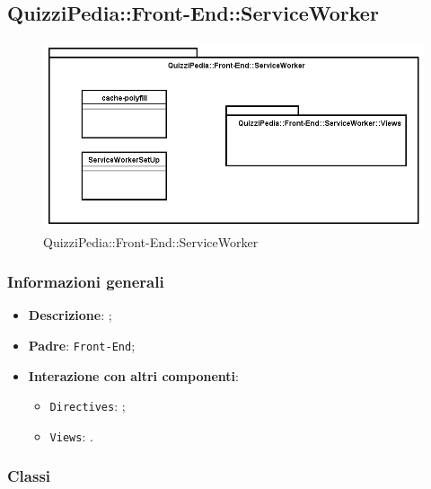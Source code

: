 \newpage
\subsection{QuizziPedia::Front-End::ServiceWorker}


\begin{figure} [ht]
	\centering
	\includegraphics[scale=0.42]{UML/Package/QuizziPedia_Front-End_ServiceWorker.png}
	\caption{QuizziPedia::Front-End::ServiceWorker}
\end{figure} \FloatBarrier

\subsubsection{Informazioni generali}
\begin{itemize}
	\item \textbf{Descrizione}:	;
	\item \textbf{Padre}: \texttt{Front-End};
	\item \textbf{Interazione con altri componenti}:
	\begin{itemize}
		\item \texttt{Directives}: ;
		\item \texttt{Views}: .
	\end{itemize} 
\end{itemize}
\subsubsection{Classi}




